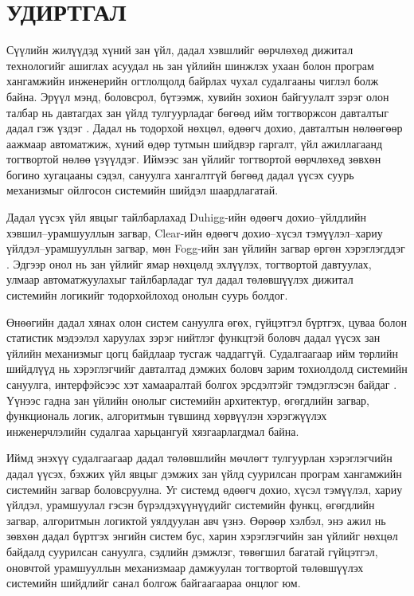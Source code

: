 ﻿\chapter{УДИРТГАЛ}

Сүүлийн жилүүдэд хүний зан үйл, дадал хэвшлийг өөрчлөхөд дижитал технологийг ашиглах асуудал нь зан үйлийн шинжлэх ухаан болон програм хангамжийн инженерийн огтлолцолд байрлах чухал судалгааны чиглэл болж байна. Эрүүл мэнд, боловсрол, бүтээмж, хувийн зохион байгуулалт зэрэг олон талбар нь давтагдах зан үйлд тулгуурладаг бөгөөд ийм тогтворжсон давталтыг дадал гэж үздэг \cite{ref1}. Дадал нь тодорхой нөхцөл, өдөөгч дохио, давталтын нөлөөгөөр аажмаар автоматжиж, хүний өдөр тутмын шийдвэр гаргалт, үйл ажиллагаанд тогтвортой нөлөө үзүүлдэг. Иймээс зан үйлийг тогтвортой өөрчлөхөд зөвхөн богино хугацааны сэдэл, сануулга хангалтгүй бөгөөд дадал үүсэх суурь механизмыг ойлгосон системийн шийдэл шаардлагатай.

Дадал үүсэх үйл явцыг тайлбарлахад Duhigg-ийн өдөөгч дохио--үйлдлийн хэвшил--урамшууллын загвар, Clear-ийн өдөөгч дохио--хүсэл тэмүүлэл--хариу үйлдэл--урамшууллын загвар, мөн Fogg-ийн зан үйлийн загвар өргөн хэрэглэгддэг \cite{ref2,ref3,ref4}. Эдгээр онол нь зан үйлийг ямар нөхцөлд эхлүүлэх, тогтвортой давтуулах, улмаар автоматжуулахыг тайлбарладаг тул дадал төлөвшүүлэх дижитал системийн логикийг тодорхойлоход онолын суурь болдог.

Өнөөгийн дадал хянах олон систем сануулга өгөх, гүйцэтгэл бүртгэх, цуваа болон статистик мэдээлэл харуулах зэрэг нийтлэг функцтэй боловч дадал үүсэх зан үйлийн механизмыг цогц байдлаар тусгаж чаддаггүй. Судалгаагаар ийм төрлийн шийдлүүд нь хэрэглэгчийг давталтад дэмжих боловч зарим тохиолдолд системийн сануулга, интерфэйсээс хэт хамааралтай болгох эрсдэлтэйг тэмдэглэсэн байдаг \cite{ref5}. Үүнээс гадна зан үйлийн онолыг системийн архитектур, өгөгдлийн загвар, функциональ логик, алгоритмын түвшинд хөрвүүлэн хэрэгжүүлэх инженерчлэлийн судалгаа харьцангуй хязгаарлагдмал байна.

Иймд энэхүү судалгаагаар дадал төлөвшлийн мөчлөгт тулгуурлан хэрэглэгчийн дадал үүсэх, бэхжих үйл явцыг дэмжих зан үйлд суурилсан програм хангамжийн системийн загвар боловсруулна. Уг системд өдөөгч дохио, хүсэл тэмүүлэл, хариу үйлдэл, урамшуулал гэсэн бүрэлдэхүүнүүдийг системийн функц, өгөгдлийн загвар, алгоритмын логиктой уялдуулан авч үзнэ. Өөрөөр хэлбэл, энэ ажил нь зөвхөн дадал бүртгэх энгийн систем бус, харин хэрэглэгчийн зан үйлийг нөхцөл байдалд суурилсан сануулга, сэдлийн дэмжлэг, төвөгшил багатай гүйцэтгэл, оновчтой урамшууллын механизмаар дамжуулан тогтвортой төлөвшүүлэх системийн шийдлийг санал болгож байгаагаараа онцлог юм.

